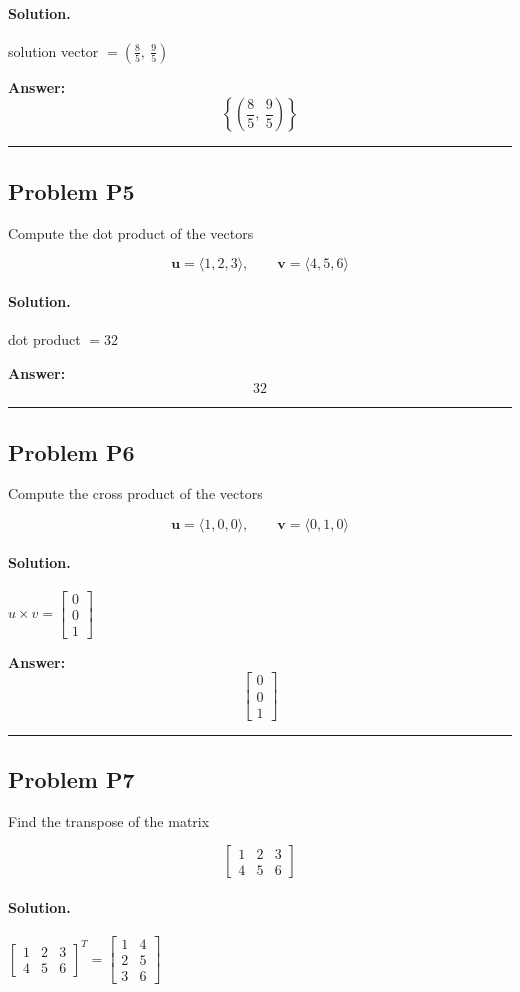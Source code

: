 \documentclass[12pt, a4paper]{article}
\newcommand{\problem}[1]{\subsection*{Problem #1}}
\newcommand{\solution}{\paragraph{Solution.}}
\begin{document}
\solution

solution vector $= \left( \frac{8}{5}, \  \frac{9}{5}\right)$

\textbf{Answer:}
\[\boxed{\left\{\left( \frac{8}{5}, \  \frac{9}{5}\right)\right\}}\]

\vspace{1em}
\hrule
\vspace{1em}

\problem{P5}

Compute the dot product of the vectors

$$\mathbf{u} = \langle 1, 2, 3 \rangle,\qquad \mathbf{v} = \langle 4, 5, 6 \rangle$$

\solution

dot product $= 32$

\textbf{Answer:}
\[\boxed{32}\]

\vspace{1em}
\hrule
\vspace{1em}

\problem{P6}

Compute the cross product of the vectors

$$\mathbf{u} = \langle 1, 0, 0 \rangle,\qquad \mathbf{v} = \langle 0, 1, 0 \rangle$$

\solution

$u \times v = \left[\begin{matrix}0\\0\\1\end{matrix}\right]$

\textbf{Answer:}
\[\boxed{\left[\begin{matrix}0\\0\\1\end{matrix}\right]}\]

\vspace{1em}
\hrule
\vspace{1em}

\problem{P7}

Find the transpose of the matrix

$$\begin{bmatrix}1 & 2 & 3\\4 & 5 & 6\end{bmatrix}$$

\solution

$\left[\begin{matrix}1 & 2 & 3\\4 & 5 & 6\end{matrix}\right]^{T} = \left[\begin{matrix}1 & 4\\2 & 5\\3 & 6\end{matrix}\right]$
\end{document}
